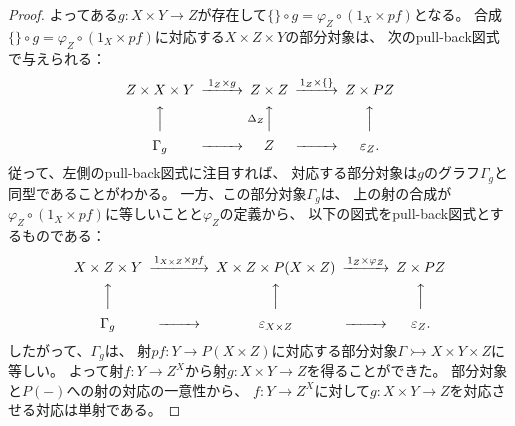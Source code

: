 \documentclass[uplatex]{jsarticle}
\theoremstyle{definition}
\def\ep{\varepsilon}
\newcommand{\rtot}{\rightarrowtail}
\begin{document}
\begin{proof}
  よってある\(g:X\times Y \to Z\)が存在して\(\{\}\circ g = \varphi_Z\circ (1_X\times pf)\)となる。
  合成\(\{\}\circ g = \varphi_Z\circ (1_X\times pf)\)に対応する\(X\times Z\times Y\)の部分対象は、
  次のpull-back図式で与えられる：
  \[
  \begin{CD}
    Z\times X\times Y @>1_Z\times g >> Z\times Z @> 1_Z \times \{\} >> Z\times PZ \\
    @AAA @A \Delta_Z AA @AAA \\
    \Gamma_g @>>> Z @>>> \ep_Z.
  \end{CD}
  \]
  従って、左側のpull-back図式に注目すれば、
  対応する部分対象は\(g\)のグラフ\(\Gamma_g\)と同型であることがわかる。
  一方、この部分対象\(\Gamma_g\)は、
  上の射の合成が\(\varphi_Z\circ (1_X\times pf)\)に等しいことと\(\varphi_Z\)の定義から、
  以下の図式をpull-back図式とするものである：
  \[
  \begin{CD}
    X\times Z \times Y @> 1_{X\times Z} \times pf >> X\times Z \times P(X\times Z)
    @> 1_Z \times \varphi_Z >> Z\times PZ \\
    @AAA @AAA @AAA \\
    \Gamma_g @>>> \ep_{X\times Z} @>>> \ep_Z.
  \end{CD}
  \]
  したがって、\(\Gamma_g\)は、
  射\(pf: Y \to P(X\times Z)\)に対応する部分対象\(\Gamma\rtot X\times Y \times Z\)に等しい。
  よって射\(f:Y\to Z^X\)から射\(g:X\times Y \to Z\)を得ることができた。
  部分対象と\(P(-)\)への射の対応の一意性から、
  \(f:Y\to Z^X\)に対して\(g:X\times Y \to Z\)を対応させる対応は単射である。


\end{proof}
\end{document}
